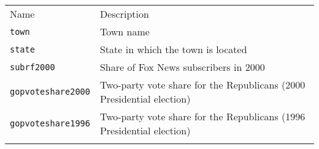 \documentclass[]{article}
\begin{document}
\begin{longtable}[c]{@{}ll@{}}
\toprule\addlinespace
\begin{minipage}[b]{0.25\columnwidth}\raggedright
Name
\end{minipage} & \begin{minipage}[b]{0.68\columnwidth}\raggedright
Description
\end{minipage}
\\\addlinespace
\midrule\endhead
\begin{minipage}[t]{0.25\columnwidth}\raggedright
\texttt{town}
\end{minipage} & \begin{minipage}[t]{0.68\columnwidth}\raggedright
Town name
\end{minipage}
\\\addlinespace
\begin{minipage}[t]{0.25\columnwidth}\raggedright
\texttt{state}
\end{minipage} & \begin{minipage}[t]{0.68\columnwidth}\raggedright
State in which the town is located
\end{minipage}
\\\addlinespace
\begin{minipage}[t]{0.25\columnwidth}\raggedright
\texttt{subrf2000}
\end{minipage} & \begin{minipage}[t]{0.68\columnwidth}\raggedright
Share of Fox News subscribers in 2000
\end{minipage}
\\\addlinespace
\begin{minipage}[t]{0.25\columnwidth}\raggedright
\texttt{gopvoteshare2000}
\end{minipage} & \begin{minipage}[t]{0.68\columnwidth}\raggedright
Two-party vote share for the Republicans (2000 Presidential election)
\end{minipage}
\\\addlinespace
\begin{minipage}[t]{0.25\columnwidth}\raggedright
\texttt{gopvoteshare1996}
\end{minipage} & \begin{minipage}[t]{0.68\columnwidth}\raggedright
Two-party vote share for the Republicans (1996 Presidential election)
\end{minipage}
\\\addlinespace
\begin{minipage}[t]{0.25\columnwidth}\raggedright

\end{minipage}
\end{longtable}
\end{document}
